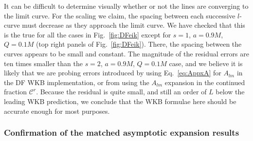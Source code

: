 \begin{refsection}
It can be difficult to determine visually whether or not the lines are converging to the limit curve.
For the scaling we claim, the spacing between each successive $l$-curve must decrease as they approach the limit curve.
We have checked that this is the true for all the cases in Fig.~\ref{fig:DFeik} except for $s = 1$, $a = 0.9M$, $Q = 0.1M$ (top right panels of Fig.~\ref{fig:DFeik}).
There, the spacing between the curves appears to be small and constant.
The magnitude of the residual errors are ten times smaller than the $s = 2$, $a = 0.9M$, $Q = 0.1M$ case, and we believe it is likely that we are probing errors introduced by using Eq.~\eqref{eq:AppxA} for $A_{lm}$ in the DF WKB implementation, or from using the $A_{lm}$ expansion in the continued fraction $\mathcal C^r$.
Because the residual is quite small, and still an order of $L$ below the leading WKB prediction, we conclude that the WKB formulae here should be accurate enough for most purposes.


\subsubsection{Confirmation of the matched asymptotic expansion results}


\end{refsection}
